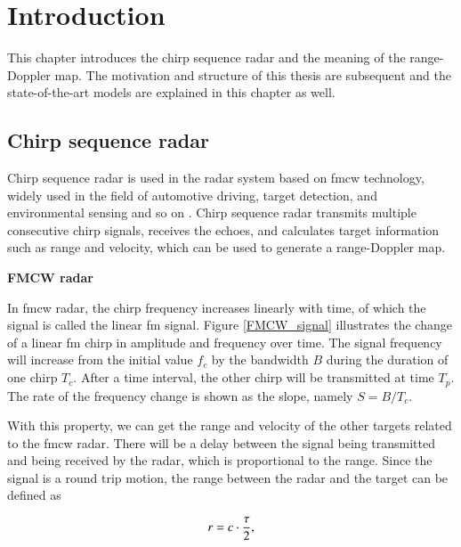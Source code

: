 \chapter{Introduction} \label{introduction}
This chapter introduces the chirp sequence radar and the meaning of the range-Doppler map. The motivation and structure of this thesis are subsequent and the state-of-the-art models are explained in this chapter as well.

\section{Chirp sequence radar} \label{chirp sequence radar}
Chirp sequence radar is used in the radar system based on \gls{fmcw} technology, widely used in the field of automotive driving, target detection, and environmental sensing and so on \cite{7556357}. Chirp sequence radar transmits multiple consecutive chirp signals, receives the echoes, and calculates target information such as range and velocity, which can be used to generate a range-Doppler map.

\begin{spacing}{1.5}
\textbf{\large{FMCW radar}}
\end{spacing}

In \gls{fmcw} radar, the chirp frequency increases linearly with time, of which the signal is called the linear \gls{fm} signal. Figure \ref{FMCW_signal} illustrates the change of a linear \gls{fm} chirp in amplitude and frequency over time. The signal frequency will increase from the initial value $f_c$ by the bandwidth $B$ during the duration of one chirp $T_c$. After a time interval, the other chirp will be transmitted at time $T_p$. The rate of the frequency change is shown as the slope, namely $S=B/T_c$.

With this property, we can get the range and velocity of the other targets related to the \gls{fmcw} radar. There will be a delay between the signal being transmitted and being received by the radar, which is proportional to the range. Since the signal is a round trip motion, the range between the radar and the target can be defined as

\begin{equation}
    \centering
    r = c \cdot \frac{\tau}{2},
    \label{propagation delay formula}
\end{equation}

